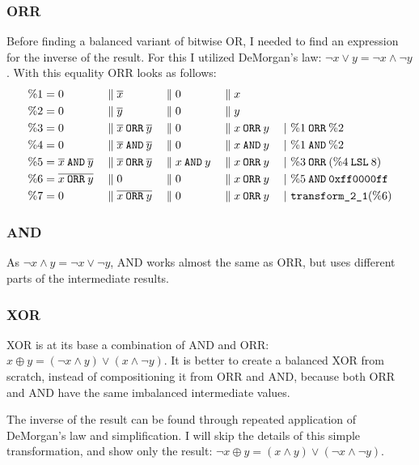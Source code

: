 \subsubsection{ORR}
Before finding a balanced variant of bitwise OR, I needed to find an expression for the inverse of the result.
For this I utilized DeMorgan's law: $\neg{x \lor y} = \neg{x} \land \neg{y}$.
With this equality ORR looks as follows:
\begin{align*}
  \%1 &= 0 &&\; \| \; \overline{x} &&\; \| \; 0 &&\; \| \; x &&\\
  \%2 &= 0 &&\; \| \; \overline{y} &&\; \| \; 0 &&\; \| \; y &&\\
  \%3 &= 0 &&\; \| \; \overline{x} \mathbin{\texttt{ORR}} \overline{y} &&\; \| \; 0 &&\; \| \; x \mathbin{\texttt{ORR}} y && \;|\ \%1 \mathbin{\texttt{ORR}} \%2\\
  \%4 &= 0 &&\; \| \; \overline{x} \mathbin{\texttt{AND}} \overline{y} &&\; \| \; 0 &&\; \| \; x \mathbin{\texttt{AND}} y && \;|\ \%1 \mathbin{\texttt{AND}} \%2\\
  \%5 &= \overline{x} \mathbin{\texttt{AND}} \overline{y} &&\; \| \; \overline{x} \mathbin{\texttt{ORR}} \overline{y} &&\; \| \; x \mathbin{\texttt{AND}} y &&\; \| \; x \mathbin{\texttt{ORR}} y && \;|\ \%3 \mathbin{\texttt{ORR}} (\%4 \mathbin{\texttt{LSL}} 8)\\
  \%6 &= \overline{x \mathbin{\texttt{ORR}} y} &&\; \| \; 0 &&\; \| \; 0 &&\; \| \; x \mathbin{\texttt{ORR}} y && \;|\ \%5 \mathbin{\texttt{AND}} \texttt{0xff0000ff}\\
  \%7 &= 0 &&\; \| \; \overline{x \mathbin{\texttt{ORR}} y} &&\; \| \; 0 &&\; \| \; x \mathbin{\texttt{ORR}} y && \;|\ \texttt{transform\_2\_1}(\%6)
\end{align*}

\subsubsection{AND}
As $\neg{x \land y} = \neg{x} \lor \neg{y}$, AND works almost the same as ORR, but uses different parts of the intermediate results.

\subsubsection{XOR}
XOR is at its base a combination of AND and ORR: $x \oplus y = (\neg{x} \land y) \lor (x \land \neg{y})$.
It is better to create a balanced XOR from scratch, instead of compositioning it from ORR and AND, because both ORR and AND have the same imbalanced intermediate values.

The inverse of the result can be found through repeated application of DeMorgan's law and simplification.
I will skip the details of this simple transformation, and show only the result: $\neg{x \oplus y} = (x \land y) \lor (\neg{x} \land \neg{y})$.

